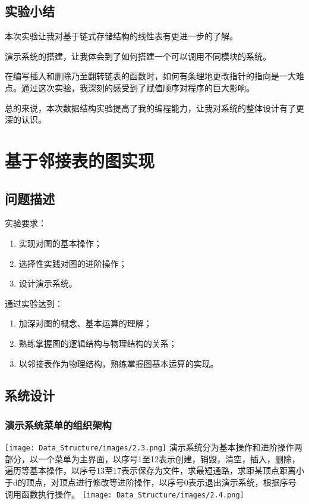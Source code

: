 \documentclass[supercite]{Experimental_Report}
\theoremstyle{definition}
\begin{document}
\subsection{实验小结}

本次实验让我对基于链式存储结构的线性表有更进一步的了解。\par
演示系统的搭建，让我体会到了如何搭建一个可以调用不同模块的系统。\par
在编写插入和删除乃至翻转链表的函数时，如何有条理地更改指针的指向是一大难点。通过这次实验，我深刻的感受到了赋值顺序对程序的巨大影响。\par
总的来说，本次数据结构实验提高了我的编程能力，让我对系统的整体设计有了更深的认识。

\newpage
\section{基于邻接表的图实现}

\subsection{问题描述}
\noindent 实验要求：
\begin{enumerate}
	\item 实现对图的基本操作；
	\item 选择性实践对图的进阶操作；
	\item 设计演示系统。
\end{enumerate}
通过实验达到：
\begin{enumerate}
	\item 加深对图的概念、基本运算的理解；	
	\item 熟练掌握图的逻辑结构与物理结构的关系；
	\item 以邻接表作为物理结构，熟练掌握图基本运算的实现。
\end{enumerate}

\subsection{系统设计}
\subsubsection{演示系统菜单的组织架构}
\texttt{[image: Data\_Structure/images/2.3.png]}
\vspace{-0.2cm}
\newpage
\quad 演示系统分为基本操作和进阶操作两部分，以一个菜单为主界面，以序号1至12表示创建，销毁，清空，插入，删除，遍历等基本操作，以序号13至17表示保存为文件，求最短通路，求距某顶点距离小于d的顶点，对顶点进行修改等进阶操作，以序号0表示退出演示系统，根据序号调用函数执行操作。
\texttt{[image: Data\_Structure/images/2.4.png]}
\vspace{-0.2cm}
\end{document}
